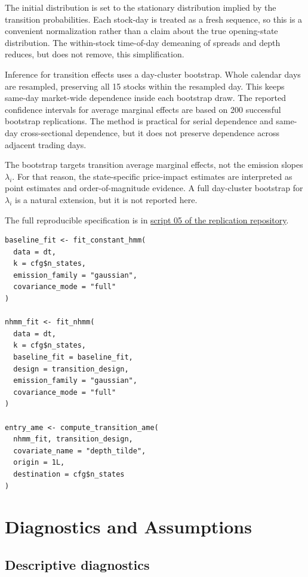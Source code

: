 \documentclass[12pt,a4paper]{article}
\begin{document}
The initial distribution is set to the stationary distribution implied by the transition probabilities. Each stock-day is treated as a fresh sequence, so this is a convenient normalization rather than a claim about the true opening-state distribution. The within-stock time-of-day demeaning of spreads and depth reduces, but does not remove, this simplification.

Inference for transition effects uses a day-cluster bootstrap. Whole calendar days are resampled, preserving all 15 stocks within the resampled day. This keeps same-day market-wide dependence inside each bootstrap draw. The reported confidence intervals for average marginal effects are based on 200 successful bootstrap replications. The method is practical for serial dependence and same-day cross-sectional dependence, but it does not preserve dependence across adjacent trading days.

The bootstrap targets transition average marginal effects, not the emission slopes \(\lambda_i\). For that reason, the state-specific price-impact estimates are interpreted as point estimates and order-of-magnitude evidence. A full day-cluster bootstrap for \(\lambda_i\) is a natural extension, but it is not reported here.

The full reproducible specification is in \href{https://github.com/nikolajtagin/regime-dependent-price-impact-in-the-moex-limit-order-book/tree/main/code}{script 05 of the replication repository}.

\begin{lstlisting}[style=rcode,caption={Core R calls behind the primary HMM and NHMM},label={lst:core_r}]
baseline_fit <- fit_constant_hmm(
  data = dt,
  k = cfg$n_states,
  emission_family = "gaussian",
  covariance_mode = "full"
)

nhmm_fit <- fit_nhmm(
  data = dt,
  k = cfg$n_states,
  baseline_fit = baseline_fit,
  design = transition_design,
  emission_family = "gaussian",
  covariance_mode = "full"
)

entry_ame <- compute_transition_ame(
  nhmm_fit, transition_design,
  covariate_name = "depth_tilde",
  origin = 1L,
  destination = cfg$n_states
)
\end{lstlisting}

\section{Diagnostics and Assumptions}\label{sec:diagnostics}

\subsection{Descriptive diagnostics}\label{sec:descriptive_diagnostics}
\end{document}
